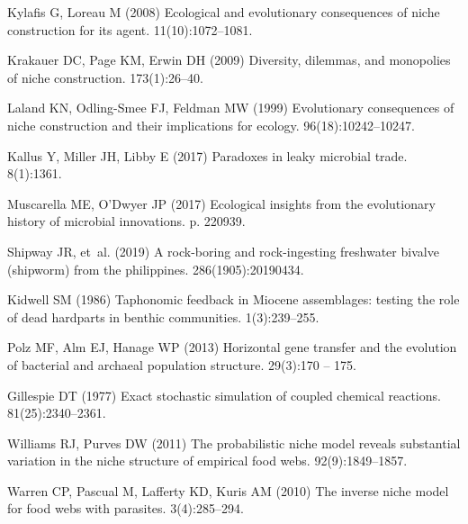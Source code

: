 \documentclass[9pt,twocolumn,twoside]{pnas-new}
\begin{document}
\begin{thebibliography}{10}
Kylafis G, Loreau M (2008) Ecological and evolutionary consequences of niche
  construction for its agent.
 11(10):1072--1081.

Krakauer DC, Page KM, Erwin DH (2009) {Diversity, dilemmas, and monopolies of
  niche construction.}
 173(1):26--40.

Laland KN, Odling-Smee FJ, Feldman MW (1999) {Evolutionary consequences of
  niche construction and their implications for ecology}.
 96(18):10242--10247.

Kallus Y, Miller JH, Libby E (2017) {Paradoxes in leaky microbial trade}.
 8(1):1361.

Muscarella ME, O'Dwyer JP (2017) Ecological insights from the evolutionary
  history of microbial innovations.
 p. 220939.

Shipway JR, et~al. (2019) A rock-boring and rock-ingesting freshwater bivalve
  (shipworm) from the philippines.
 286(1905):20190434.

Kidwell SM (1986) Taphonomic feedback in {M}iocene assemblages: testing the
  role of dead hardparts in benthic communities.
 1(3):239--255.

Polz MF, Alm EJ, Hanage WP (2013) Horizontal gene transfer and the evolution of
  bacterial and archaeal population structure.
 29(3):170 -- 175.

Gillespie DT (1977) Exact stochastic simulation of coupled chemical reactions.
 81(25):2340--2361.

Williams RJ, Purves DW (2011) {The probabilistic niche model reveals
  substantial variation in the niche structure of empirical food webs.}
 92(9):1849--1857.

Warren CP, Pascual M, Lafferty KD, Kuris AM (2010) {The inverse niche model for
  food webs with parasites.}
 3(4):285--294.

\end{thebibliography}
\end{document}
